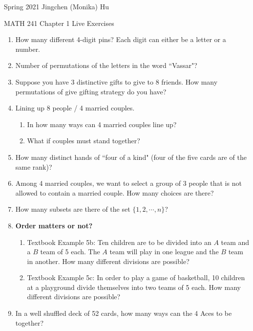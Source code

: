 \documentclass[11pt]{article}
\begin{document}
\enlargethispage{\baselineskip}

Spring 2021 \hfill Jingchen (Monika) Hu\\

\begin{center}
{\huge MATH 241 Chapter 1 Live Exercises}	\\
\end{center}
\vspace{0.5cm}

\begin{enumerate}


    \item How many different 4-digit pins? Each digit can either be a letter or a number.
   
    \item Number of permutations of the letters in the word ``Vassar"?
    
    \item Suppose you have 3 distinctive gifts to give to 8 friends. How many permutations of give gifting strategy do you have?
    
    \item Lining up 8 people / 4 married couples.
    
    \begin{enumerate}
    \item In how many ways can 4 married couples line up? 
    \item What if couples must stand together?
    \end{enumerate}

     \item How many distinct hands of ``four of a kind" (four of the five cards are of the same rank)?
     
     \item Among 4 married couples, we want to select a group of 3 people that is not allowed to contain a married couple. How many choices are there?
     
     \item How many subsets are there of the set $\{1, 2, \cdots, n\}$?
     
     \item {\bf Order matters or not?}
     
     	\begin{enumerate}
	\item Textbook Example 5b: Ten children are to be divided into an $A$ team and a $B$ team of 5 each. The $A$ team will play in one league and the $B$ team in another. How many different divisions are possible?
	
	\item Textbook Example 5c: In order to play a game of basketball, 10 children at a playground divide themselves into two teams of 5 each. How many different divisions are possible?
	\end{enumerate}
	
      \item In a well shuffled deck of 52 cards, how many ways can the 4 Aces to be together?

\end{enumerate}
\end{document}
